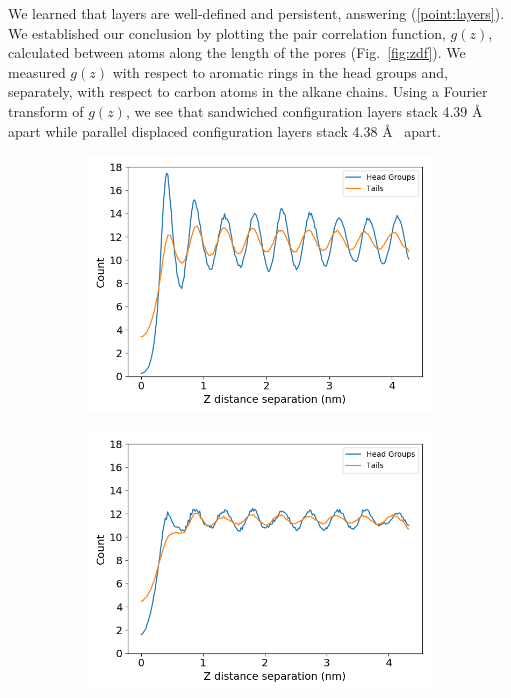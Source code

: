 \documentclass{article}
\newcommand{\angstrom}{\textup{\AA}}
\begin{document}
  We learned that layers are well-defined and persistent, answering
  (\ref{point:layers}). We established our conclusion by plotting the pair
  correlation function, $g(z)$, calculated between atoms along the length of the
  pores (Fig.~\ref{fig:zdf}). We measured $g(z)$ with respect to aromatic rings in
  the head groups and, separately, with respect to carbon atoms in the alkane
  chains. Using a Fourier transform of $g(z)$, we see that sandwiched
  configuration layers stack 4.39 \angstrom~ apart while parallel displaced
  configuration layers stack 4.38 \angstrom~ apart.

  \begin{figure}
        \centering
        \begin{subfigure}{0.45\textwidth}
                \centering
                \includegraphics[width=\textwidth]{zdf_overlay_layered.png}
                \caption{}\label{fig:zdf_layered}
        \end{subfigure}
        \begin{subfigure}{0.45\textwidth}
                \centering
                \includegraphics[width=\textwidth]{zdf_overlay_offset.png}

\end{subfigure}
\end{figure}
\end{document}
